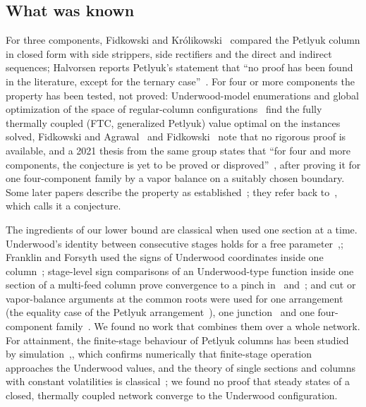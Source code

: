 \documentclass[11pt,a4paper]{report}
\begin{document}
\subsection{What was known}

For three components, Fidkowski and Kr\'olikowski~\autocite{FK87} compared the Petlyuk column in closed form with side
strippers, side rectifiers and the direct and indirect sequences; Halvorsen reports Petlyuk's statement that ``no proof
has been found in the literature, except for the ternary case''~\autocite[\S6]{HS3}. For four or more components the
property has been tested, not proved: Underwood-model enumerations and global optimization of the space of
regular-column configurations~\autocite{SA10,Nallasivam2016,TGAT} find the fully thermally coupled (FTC, generalized
Petlyuk) value optimal on the instances solved, Fidkowski and Agrawal~\autocite{FA01} and Fidkowski~\autocite{Fidkowski2006}
note that no rigorous proof is available, and a 2021 thesis from the same group states that ``for four and more components,
the conjecture is yet to be proved or disproved''~\autocite[p.~125]{MathewThesis}, after proving it for one
four-component family by a vapor balance on a suitably chosen boundary. Some later papers describe the property as
established~\autocite{HS2011,NavarroAmoros2013,CaballeroGrossmann2014}; they refer back to~\autocite{HS3}, which calls
it a conjecture.

The ingredients of our lower bound are classical when used one section at a time. Underwood's identity between
consecutive stages holds for a free parameter~\autocite{Underwood1948},\autocite[eqs.~(2.45)--(2.49)]{HalvorsenThesis}; Franklin
and Forsyth used the signs of Underwood coordinates inside one column~\autocite{FranklinForsyth1953}; stage-level sign
comparisons of an Underwood-type function inside one section of a multi-feed column prove convergence to a
pinch in~\autocite[Prop.~5.4.1]{JiangThesis} and~\autocite[Prop.~1]{Jiang2022}; and cut or vapor-balance arguments at the
common roots were used for one arrangement (the equality case of the Petlyuk arrangement~\autocite[\S3]{HS3}), one
junction~\autocite[\S6.2.1]{HalvorsenThesis} and one four-component family~\autocite[\S6.3]{MathewThesis}. We found no work
that combines them over a whole network. For attainment, the finite-stage behaviour of Petlyuk columns has been studied by
simulation~\autocite{HS1999,MalinenTanskanen2007},\autocite[\S5.2.7]{HalvorsenThesis}, which confirms numerically that
finite-stage operation approaches the Underwood values, and the theory of single sections and columns with constant
volatilities is classical~\autocite{Underwood1948,FranklinForsyth1953,AcrivosAmundson1955,PetlyukBook}; we found no proof that
steady states of a closed, thermally coupled network converge to the Underwood configuration.
\end{document}
